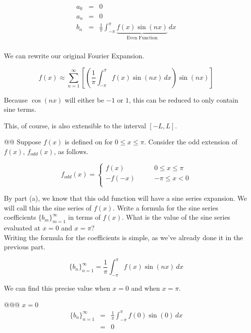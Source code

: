 \documentclass[10pt]{article}
\begin{document}
\begin{easylist}[enumerate]
    \begin{align*}
        a_0 &=& 0\\
        a_n &=& 0\\
        b_n &=& \frac{1}{\pi} \int_{-\pi}^\pi \underbrace{f(x) \sin(nx)}_{\text{Even Function}} \, dx\\
    \end{align*}

    We can rewrite our original Fourier Expansion.

    \[
        f(x) \approx \sum_{n=1}^\infty \left[ \left( \frac{1}{\pi} \int_{-\pi}^\pi f(x) \sin(nx) \, dx \right) \sin(nx) \right]
    \]

    Because $\cos(nx)$ will either be $-1$ or $1$, this can be reduced to only contain sine terms.

    This, of course, is also extensible to the interval $[-L, L]$.

    @@ Suppose $f(x)$ is defined on for $0 \le x \le \pi$. Consider the odd extension of $f(x)$, $f_{odd}(x)$, as
    follows.

    \[
        f_{odd}(x) = \begin{cases}
            f(x) \qquad &0 \le x \le \pi\\
            -f(-x) \qquad &-\pi \le x < 0\\
        \end{cases}
    \]

    By part (a), we know that this odd function will have a sine series expansion. We will call this the sine series of
    $f(x)$. Write a formula for the sine series coefficients ${\{b_m\}}_{m=1}^\infty$ in terms of $f(x)$. What is the
    value of the sine series evaluated at $x=0$ and $x=\pi$?\\

    Writing the formula for the coefficients is simple, as we've already done it in the previous part.

    \[
         {\{b_n\}}_{n=1}^\infty = \frac{1}{\pi} \int_{-\pi}^\pi f(x) \sin(nx) \, dx
    \]

    We can find this precise value when $x = 0$ and when $x = \pi$.

    @@@ $x = 0$
    \begin{align*}
         {\{b_n\}}_{n=1}^\infty &=& \frac{1}{\pi} \int_{-\pi}^\pi f(0) \sin(0) \, dx\\
         &=& 0\\
    \end{align*}


\end{easylist}
\end{document}
